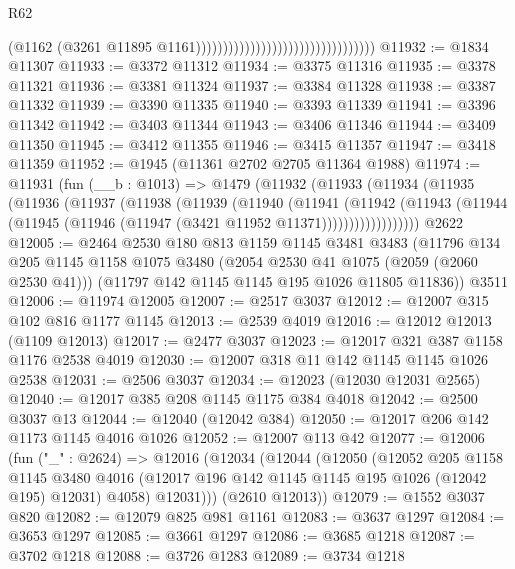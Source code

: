 \begin{lexlean}{R62}
\begin{coremodule}
                                                                  (@1162
                                                                    (@3261
                                                                      @11895
                                                                      @1161)))))))))))))))))))))))))))))))))
@11932 := @1834 @11307
@11933 := @3372 @11312
@11934 := @3375 @11316
@11935 := @3378 @11321
@11936 := @3381 @11324
@11937 := @3384 @11328
@11938 := @3387 @11332
@11939 := @3390 @11335
@11940 := @3393 @11339
@11941 := @3396 @11342
@11942 := @3403 @11344
@11943 := @3406 @11346
@11944 := @3409 @11350
@11945 := @3412 @11355
@11946 := @3415 @11357
@11947 := @3418 @11359
@11952 := @1945 (@11361 @2702 @2705 @11364 @1988)
@11974 := @11931
    (fun (__b : @1013) =>
    @1479
      (@11932
        (@11933
          (@11934
            (@11935
              (@11936
                (@11937
                  (@11938
                    (@11939
                      (@11940
                        (@11941
                          (@11942
                            (@11943
                              (@11944 (@11945 (@11946 (@11947 (@3421 @11952 @11371))))))))))))))))))
    @2622
@12005 := @2464
    @2530
    @180
    @813
    @1159
    @1145
    @3481
    @3483
    (@11796
      @134
      @205
      @1145
      @1158
      @1075
      @3480
      (@2054 @2530 @41 @1075 (@2059 (@2060 @2530 @41)))
      (@11797 @142 @1145 @1145 @195 @1026 @11805 @11836))
    @3511
@12006 := @11974 @12005
@12007 := @2517 @3037
@12012 := @12007 @315 @102 @816 @1177 @1145
@12013 := @2539 @4019
@12016 := @12012 @12013 (@1109 @12013)
@12017 := @2477 @3037
@12023 := @12017 @321 @387 @1158 @1176 @2538 @4019
@12030 := @12007 @318 @11 @142 @1145 @1145 @1026 @2538
@12031 := @2506 @3037
@12034 := @12023 (@12030 @12031 @2565)
@12040 := @12017 @385 @208 @1145 @1175 @384 @4018
@12042 := @2500 @3037 @13
@12044 := @12040 (@12042 @384)
@12050 := @12017 @206 @142 @1173 @1145 @4016 @1026
@12052 := @12007 @113 @42
@12077 := @12006
    (fun ("_" : @2624) =>
    @12016
      (@12034
        (@12044
          (@12050
            (@12052
              @205
              @1158
              @1145
              @3480
              @4016
              (@12017 @196 @142 @1145 @1145 @195 @1026 (@12042 @195) @12031)
              @4058)
            @12031)))
      (@2610 @12013))
@12079 := @1552 @3037 @820
@12082 := @12079 @825 @981 @1161
@12083 := @3637 @1297
@12084 := @3653 @1297
@12085 := @3661 @1297
@12086 := @3685 @1218
@12087 := @3702 @1218
@12088 := @3726 @1283
@12089 := @3734 @1218

\end{coremodule}
\end{lexlean}
